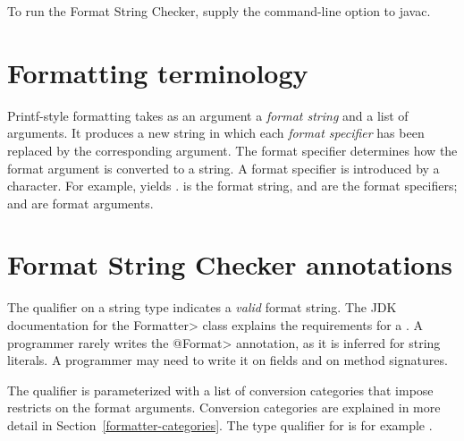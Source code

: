 To run the Format String Checker, supply the  command-line option to javac. 

\section{Formatting terminology\label{formatter-terminology}}

Printf-style formatting takes as an argument a \emph{format string} and a
list of arguments.  It produces a new string in which each \emph{format
  specifier} has been replaced by the corresponding argument.
The format specifier determines how the format argument is converted to a
string.
A format specifier is introduced by a \code{\%} character. For example,
 yields
.   is
the format string,  and  are the format specifiers;
 and  are format arguments.


\section{Format String Checker annotations\label{formatter-annotations}}

The  qualifier on a string type
indicates a \emph{valid} format string.  The JDK documentation for the
\<Formatter> class explains the requirements for a
.
A programmer rarely writes the \<@Format> annotation, as it is inferred for
string literals.  A programmer may need to write it on fields and on method
signatures.


The  qualifier is parameterized with
a list of conversion categories that impose restricts on the format arguments.
Conversion categories are explained in more detail in
Section~\ref{formatter-categories}.  The type qualifier for  is
for example .

